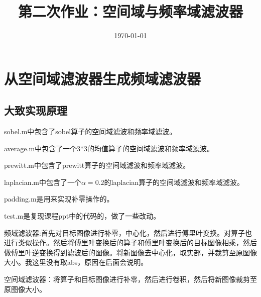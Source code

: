\documentclass[11pt, a4paper, UTF8]{ctexart}
\title{第二次作业：空间域与频率域滤波器}
\date{\today}     %
\begin{document}
\maketitle

\section{从空间域滤波器生成频域滤波器}

\subsection{大致实现原理}
  sobel.m中包含了sobel算子的空间域滤波和频率域滤波。\par 
  average.m中包含了一个3*3的均值算子的空间域滤波和频率域滤波。\par 
  prewitt.m中包含了prewitt算子的空间域滤波和频率域滤波。\par
  laplacian.m中包含了一个$\alpha=0.2$的laplacian算子的空间域滤波和频率域滤波。\par 
  padding.m是用来实现补零操作的。\par 
  test.m是复现课程ppt中的代码的，做了一些改动。\par


 频域滤波器:首先对目标图像进行补零，中心化，然后进行傅里叶变换。对算子也进行类似操作。然后将傅里叶变换后的算子和傅里叶变换后的目标图像相乘，然后做傅里叶逆变换得到滤波后的图像。将新图像去中心化，取实部，并裁剪至原图像大小。我这里没有取abs，原因在后面会说明。\par 
 空间域滤波器：将算子和目标图像进行补零，然后进行卷积，然后将新图像裁剪至原图像大小。
\end{document}
